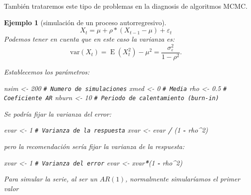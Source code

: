 \documentclass[
  spanish,
  10pt,
]{book}
\newenvironment{Shaded}{\begin{snugshade}}{\end{snugshade}}
\newcommand{\CommentTok}[1]{\textcolor[rgb]{0.56,0.35,0.01}{\textit{#1}}}
\newcommand{\DecValTok}[1]{\textcolor[rgb]{0.00,0.00,0.81}{#1}}
\newcommand{\FloatTok}[1]{\textcolor[rgb]{0.00,0.00,0.81}{#1}}
\newcommand{\NormalTok}[1]{#1}
\newcommand{\OtherTok}[1]{\textcolor[rgb]{0.56,0.35,0.01}{#1}}
\newcommand{\SpecialCharTok}[1]{\textcolor[rgb]{0.81,0.36,0.00}{\textbf{#1}}}
\theoremstyle{break}
\newtheorem{example}{Ejemplo}[chapter]
\theoremstyle{nonumberplain}
\renewcommand{\CommentTok}[1]{\textcolor[rgb]{0.41,0.41,0.41}{\texttt{#1}}}
\begin{document}
También trataremos este tipo de problemas en la diagnosis de algoritmos MCMC.

\begin{example}[simulación de un proceso autorregresivo]

\[X_t = \mu + \rho * (X_{t-1} - \mu) + \varepsilon_t\]
Podemos tener en cuenta que en este caso la varianza es:
\[\textrm{var}(X_t)=\operatorname{E}(X_t^2)-\mu^2=\frac{\sigma_\varepsilon^2}{1-\rho^2}.\]

Establecemos los parámetros:

\begin{Shaded}
\begin{Highlighting}[]
\NormalTok{nsim }\OtherTok{\textless{}{-}} \DecValTok{200}   \CommentTok{\# Numero de simulaciones}
\NormalTok{xmed }\OtherTok{\textless{}{-}} \DecValTok{0}     \CommentTok{\# Media}
\NormalTok{rho }\OtherTok{\textless{}{-}} \FloatTok{0.5}    \CommentTok{\# Coeficiente AR}
\NormalTok{nburn }\OtherTok{\textless{}{-}} \DecValTok{10}   \CommentTok{\# Periodo de calentamiento (burn{-}in)}
\end{Highlighting}
\end{Shaded}

Se podría fijar la varianza del error:

\begin{Shaded}
\begin{Highlighting}[]
\NormalTok{evar }\OtherTok{\textless{}{-}} \DecValTok{1}
\CommentTok{\# Varianza de la respuesta}
\NormalTok{xvar }\OtherTok{\textless{}{-}}\NormalTok{ evar }\SpecialCharTok{/}\NormalTok{ (}\DecValTok{1} \SpecialCharTok{{-}}\NormalTok{ rho}\SpecialCharTok{\^{}}\DecValTok{2}\NormalTok{)}
\end{Highlighting}
\end{Shaded}

pero la recomendación sería fijar la varianza de la respuesta:

\begin{Shaded}
\begin{Highlighting}[]
\NormalTok{xvar }\OtherTok{\textless{}{-}} \DecValTok{1}     
\CommentTok{\# Varianza del error}
\NormalTok{evar }\OtherTok{\textless{}{-}}\NormalTok{ xvar}\SpecialCharTok{*}\NormalTok{(}\DecValTok{1} \SpecialCharTok{{-}}\NormalTok{ rho}\SpecialCharTok{\^{}}\DecValTok{2}\NormalTok{)}
\end{Highlighting}
\end{Shaded}

Para simular la serie, al ser un \(AR(1)\), normalmente simularíamos el primer valor


\end{example}
\end{document}
